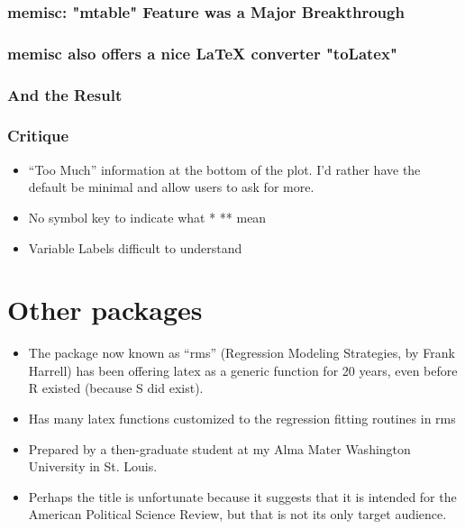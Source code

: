 \documentclass[11pt,english]{beamer}
\def\lyxframeend{} %
\def\Sweavesize{\normalsize}
\begin{document}
\begin{frame}
\frametitle{memisc: "mtable" Feature was a Major Breakthrough}


\def\Sweavesize{\scriptsize}


\end{frame}

\begin{frame}[containsverbatim]
\frametitle{memisc also offers a nice LaTeX converter "toLatex"}


\def\Sweavesize{\scriptsize}


\end{frame}

\begin{frame}
\frametitle{And the Result}


\scriptsize{

}

\end{frame}

\begin{frame}
\frametitle{Critique}
\begin{itemize}
\item ``Too Much'' information at the bottom of the plot. I'd rather have
the default be minimal and allow users to ask for more.
\item No symbol key to indicate what {*} {*}{*} mean
\item Variable Labels difficult to understand
\end{itemize}
\end{frame}


\lyxframeend{}\section{Other packages}


\lyxframeend{}
\begin{itemize}
\item The package now known as ``rms'' (Regression Modeling Strategies,
by Frank Harrell) has been offering latex as a generic function for
20 years, even before R existed (because S did exist).
\item Has many latex functions customized to the regression fitting routines
in rms
\end{itemize}

\lyxframeend{}
\begin{itemize}
\item Prepared by a then-graduate student at my Alma Mater Washington University
in St. Louis.
\item Perhaps the title is unfortunate because it suggests that it is intended
for the American Political Science Review, but that is not its only
target audience.
\end{itemize}
\end{document}
